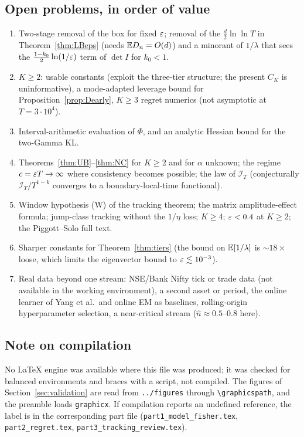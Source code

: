 \subsection{Open problems, in order of value}
\begin{enumerate}[nosep]
\item Two-stage removal of the box for fixed $\varepsilon$; removal of the $\tfrac d2\ln\ln T$ in Theorem~\ref{thm:LBeps} (needs $\mathbb{E} D_n=O(d)$) and a minorant of $1/\lambda$ that sees the $\tfrac{1-k_0}2\ln(1/\varepsilon)$ term of $\det I$ for $k_0<1$.
\item $K\ge2$: usable constants (exploit the three-tier structure; the present $C_K$ is uninformative), a mode-adapted leverage bound for Proposition~\ref{prop:Dearly}, $K\ge3$ regret numerics (not asymptotic at $T=3\cdot10^4$).
\item Interval-arithmetic evaluation of $\Phi$, and an analytic Hessian bound for the two-Gamma KL.
\item Theorems~\ref{thm:UB}--\ref{thm:NC} for $K\ge2$ and for $\alpha$ unknown; the regime $c=\varepsilon T\to\infty$ where consistency becomes possible; the law of $\mathcal I_T$ (conjecturally $\mathcal I_T/T^{1-k}$ converges to a boundary-local-time functional).
\item Window hypothesis (W) of the tracking theorem; the matrix amplitude-effect formula; jump-class tracking without the $1/\eta$ loss; $K\ge4$; $\varepsilon<0.4$ at $K\ge2$; the Piggott--Solo full text.
\item Sharper constants for Theorem~\ref{thm:tiers} (the bound on $\mathbb{E}[1/\lambda]$ is $\sim18\times$ loose, which limits the eigenvector bound to $\varepsilon\lesssim10^{-3}$).
\item Real data beyond one stream: NSE/Bank Nifty tick or trade data (not available in the working environment), a second asset or period, the online learner of Yang et al.\ and online EM as baselines, rolling-origin hyperparameter selection, a near-critical stream ($\hat n\approx0.5$--$0.8$ here).
\end{enumerate}

\subsection{Note on compilation}
No \LaTeX{} engine was available where this file was produced; it was checked for balanced environments and braces with a script, not compiled. The figures of Section~\ref{sec:validation} are read from \texttt{../figures} through \texttt{\textbackslash graphicspath}, and the preamble loads \texttt{graphicx}. If compilation reports an undefined reference, the label is in the corresponding part file (\texttt{part1\_model\_fisher.tex}, \texttt{part2\_regret.tex}, \texttt{part3\_tracking\_review.tex}).
